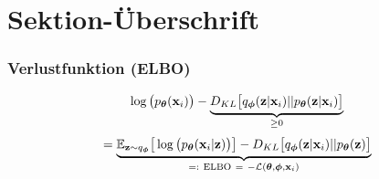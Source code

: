 

\author[Sebastian Hahn]{Nix}


\beamertemplatenavigationsymbolsempty{}



\section{Sektion-Überschrift}

\begin{frame}
	\frametitle{Verlustfunktion (ELBO)}
	\begin{align*}
	\log\big(p_{\boldsymbol\theta}(\mathbf{x}_i)\big) - \underbrace{D_{KL}\big[q_{\boldsymbol\phi}(\mathbf{z}|\mathbf{x}_i) || p_{\boldsymbol\theta}(\mathbf{z}|\mathbf{x}_i)\big]}_{\ge 0}
	\end{align*}
	\begin{align*}
	 =\underbrace{ \E_{\z\sim q_{\boldsymbol\phi}}\big[\log\big(\pdec\big)\big] - D_{KL}\big[\qenc||p_{\boldsymbol\theta}(\z)\big]}_{=:\ \mathrm{ELBO}\ =\ -\mathcal{L}(\boldsymbol\theta,\boldsymbol\phi,\mathbf{x}_i)}
	\end{align*}
\end{frame}


